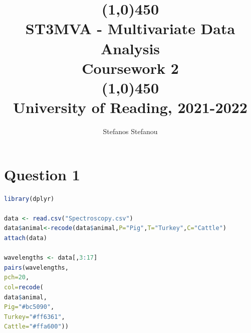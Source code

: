 \documentclass[openany]{article}
\title{\line(1,0){450}\\ ST3MVA - Multivariate Data Analysis \\ \large{Coursework 2}  \\\line(1,0){450} \\University of Reading, 2021-2022}
\author{Stefanos Stefanou}
\begin{document}
	\maketitle
	\pagebreak
	
	\section*{Question 1}
	\begin{lstlisting}[language=R]
library(dplyr)

data <- read.csv("Spectroscopy.csv")
data$animal<-recode(data$animal,P="Pig",T="Turkey",C="Cattle")
attach(data)

wavelengths <- data[,3:17]
pairs(wavelengths,
pch=20,
col=recode(
data$animal,
Pig="#bc5090",
Turkey="#ff6361",
Cattle="#ffa600"))
	\end{lstlisting}
	
\end{document}
